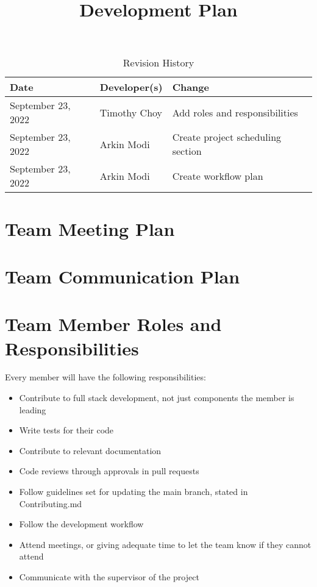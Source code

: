 \documentclass{article}
\title{Development Plan\\\progname}
\author{\authname}
\date{}
\begin{document}
\begin{table}[hp]
\caption{Revision History} \label{TblRevisionHistory}
\begin{tabularx}{\textwidth}{llX}
\toprule
\textbf{Date} & \textbf{Developer(s)} & \textbf{Change}\\
\midrule
September 23, 2022 & Timothy Choy & Add roles and responsibilities\\
September 23, 2022 & Arkin Modi & Create project scheduling section\\
September 23, 2022 & Arkin Modi & Create workflow plan\\
\bottomrule
\end{tabularx}
\end{table}

\newpage

\maketitle


\section{Team Meeting Plan}

\section{Team Communication Plan}

\section{Team Member Roles and Responsibilities}

Every member will have the following responsibilities:

\begin{itemize}
	\item Contribute to full stack development, not just components the member is leading
	\item Write tests for their code
	\item Contribute to relevant documentation
	\item Code reviews through approvals in pull requests
	\item Follow guidelines set for updating the main branch, stated in Contributing.md
	\item Follow the development workflow
	\item Attend meetings, or giving adequate time to let the team know if they cannot attend
	\item Communicate with the supervisor of the project
\end{itemize}
\end{document}
